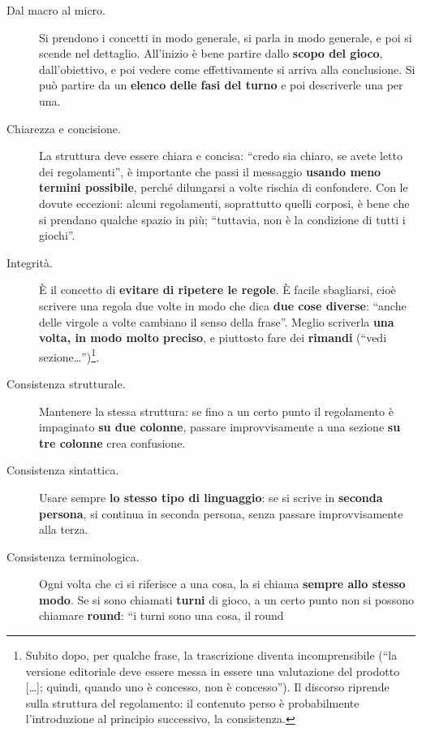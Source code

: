 \begin{description}
  \item[Dal macro al micro.] Si prendono i concetti in modo generale, si parla in modo
        generale, e poi si scende nel dettaglio. All'inizio è bene partire dallo
        \textbf{scopo del gioco}, dall'obiettivo, e poi vedere come effettivamente si arriva
        alla conclusione. Si può partire da un \textbf{elenco delle fasi del turno} e poi
        descriverle una per una.
  \item[Chiarezza e concisione.] La struttura deve essere chiara e concisa: ``credo sia
        chiaro, se avete letto dei regolamenti'', è importante che passi il messaggio
        \textbf{usando meno termini possibile}, perché dilungarsi a volte rischia di
        confondere. Con le dovute eccezioni: alcuni regolamenti, soprattutto quelli
        corposi, è bene che si prendano qualche spazio in più; ``tuttavia, non è la
        condizione di tutti i giochi''.
  \item[Integrità.] È il concetto di \textbf{evitare di ripetere le regole}. È facile
        sbagliarsi, cioè scrivere una regola due volte in modo che dica \textbf{due cose
        diverse}: ``anche delle virgole a volte cambiano il senso della frase''. Meglio
        scriverla \textbf{una volta, in modo molto preciso}, e piuttosto fare dei
        \textbf{rimandi} (``vedi sezione\ldots'')\footnote{Subito dopo, per qualche frase, la
        trascrizione diventa incomprensibile (``la versione editoriale deve essere messa in
        essere una valutazione del prodotto [\ldots]; quindi, quando uno è concesso, non è
        concesso''). Il discorso riprende sulla struttura del regolamento: il contenuto
        perso è probabilmente l'introduzione al principio successivo, la consistenza.}.
  \item[Consistenza strutturale.] Mantenere la stessa struttura: se fino a un certo punto
        il regolamento è impaginato \textbf{su due colonne}, passare improvvisamente a una
        sezione \textbf{su tre colonne} crea confusione.
  \item[Consistenza sintattica.] Usare sempre \textbf{lo stesso tipo di linguaggio}: se si
        scrive in \textbf{seconda persona}, si continua in seconda persona, senza passare
        improvvisamente alla terza.
  \item[Consistenza terminologica.] Ogni volta che ci si riferisce a una cosa, la si chiama
        \textbf{sempre allo stesso modo}. Se si sono chiamati \textbf{turni} di gioco, a un
        certo punto non si possono chiamare \textbf{round}: ``i turni sono una cosa, il round

\end{description}
